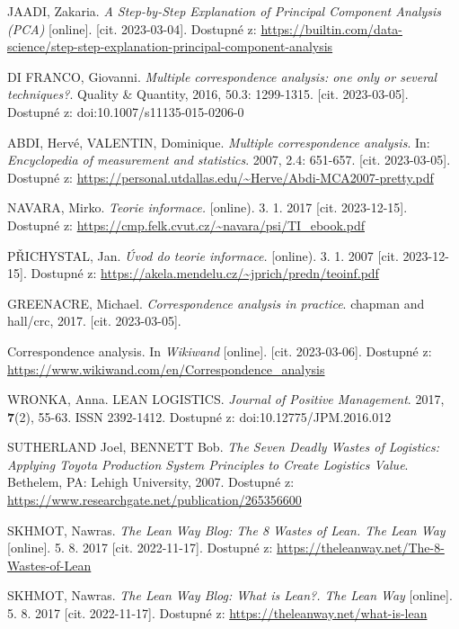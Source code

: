 \begin{thebibliography}{1}
JAADI, Zakaria. \textit{A Step-by-Step Explanation of Principal Component Analysis (PCA)
} [online].  [cit. 2023-03-04]. Dostupné z: \url{https://builtin.com/data-science/step-step-explanation-principal-component-analysis}

DI FRANCO, Giovanni. \textit{Multiple correspondence analysis: one only or several techniques?}. Quality \& Quantity, 2016, 50.3: 1299-1315. [cit. 2023-03-05]. Dostupné z: doi:10.1007/s11135-015-0206-0

ABDI, Hervé, VALENTIN, Dominique. \textit{Multiple correspondence analysis}. In: \textit{Encyclopedia of measurement and statistics}. 2007, 2.4: 651-657. [cit. 2023-03-05]. Dostupné z: \url{https://personal.utdallas.edu/\~Herve/Abdi-MCA2007-pretty.pdf}

NAVARA, Mirko. \textit{Teorie informace.} [online). 3. 1. 2017 [cit. 2023-12-15]. Dostupné z: \url{https://cmp.felk.cvut.cz/~navara/psi/TI_ebook.pdf}

PŘICHYSTAL, Jan. \textit{Úvod do teorie informace.} [online). 3. 1. 2007 [cit. 2023-12-15]. Dostupné z: \url{https://akela.mendelu.cz/~jprich/predn/teoinf.pdf}

GREENACRE, Michael. \textit{Correspondence analysis in practice}. chapman and hall/crc, 2017. [cit. 2023-03-05]. 

Correspondence analysis. In \textit{Wikiwand} [online]. [cit. 2023-03-06]. Dostupné z: \url{https://www.wikiwand.com/en/Correspondence\_analysis}

WRONKA, Anna. LEAN LOGISTICS. \textit{Journal of Positive Management}. 2017, \textbf{7}(2), 55-63. ISSN 2392-1412. Dostupné z: doi:10.12775/JPM.2016.012

SUTHERLAND Joel, BENNETT Bob. \textit{The Seven Deadly Wastes of Logistics: Applying Toyota Production System Principles to Create Logistics Value}. Bethelem, PA: Lehigh University, 2007. Dostupné z: \url{https://www.researchgate.net/publication/265356600}

SKHMOT, Nawras. \textit{The Lean Way Blog: The 8 Wastes of Lean. The Lean Way} [online]. 5. 8. 2017 [cit. 2022-11-17]. Dostupné z: \url{https://theleanway.net/The-8-Wastes-of-Lean}

SKHMOT, Nawras. \textit{The Lean Way Blog: What is Lean?. The Lean Way} [online]. 5. 8. 2017 [cit. 2022-11-17]. Dostupné z: \url{https://theleanway.net/what-is-lean}


\end{thebibliography}

